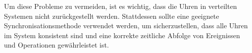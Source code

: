 Um diese Probleme zu vermeiden, ist es wichtig, dass die Uhren in verteilten Systemen nicht zurückgestellt werden. Stattdessen sollte eine geeignete Synchronisationsmethode verwendet werden, um sicherzustellen, dass alle Uhren im System konsistent sind und eine korrekte zeitliche Abfolge von Ereignissen und Operationen gewährleistet ist.

\label{Woche09}
